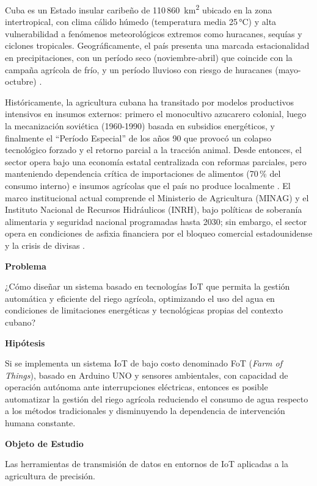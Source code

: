 Cuba es un Estado insular caribeño de 110\,860~km\textsuperscript{2} ubicado en la zona intertropical, con clima cálido húmedo (temperatura media 25\,°C) y alta vulnerabilidad a fenómenos meteorológicos extremos como huracanes, sequías y ciclones tropicales. Geográficamente, el país presenta una marcada estacionalidad en precipitaciones, con un período seco (noviembre-abril) que coincide con la campaña agrícola de frío, y un período lluvioso con riesgo de huracanes (mayo-octubre) \citep{onei2024}.

Históricamente, la agricultura cubana ha transitado por modelos productivos intensivos en insumos externos: primero el monocultivo azucarero colonial, luego la mecanización soviética (1960-1990) basada en subsidios energéticos, y finalmente el ``Período Especial'' de los años 90 que provocó un colapso tecnológico forzado y el retorno parcial a la tracción animal. Desde entonces, el sector opera bajo una economía estatal centralizada con reformas parciales, pero manteniendo dependencia crítica de importaciones de alimentos (70\,\% del consumo interno) e insumos agrícolas que el país no produce localmente \citep{rosset2020}. El marco institucional actual comprende el Ministerio de Agricultura (MINAG) y el Instituto Nacional de Recursos Hidráulicos (INRH), bajo políticas de soberanía alimentaria y seguridad nacional programadas hasta 2030; sin embargo, el sector opera en condiciones de asfixia financiera por el bloqueo comercial estadounidense y la crisis de divisas \citep{alnap2024, leyssan2022}.

\bigskip
\noindent\textbf{Problema}

\noindent ¿Cómo diseñar un sistema basado en tecnologías IoT que permita la gestión automática y eficiente del riego agrícola, optimizando el uso del agua en condiciones de limitaciones energéticas y tecnológicas propias del contexto cubano?

\bigskip
\noindent\textbf{Hipótesis}

\noindent Si se implementa un sistema IoT de bajo costo denominado FoT (\textit{Farm of Things}), basado en Arduino UNO y sensores ambientales, con capacidad de operación autónoma ante interrupciones eléctricas, entonces es posible automatizar la gestión del riego agrícola reduciendo el consumo de agua respecto a los métodos tradicionales y disminuyendo la dependencia de intervención humana constante.

\bigskip
\noindent\textbf{Objeto de Estudio}

\noindent Las herramientas de transmisión de datos en entornos de IoT aplicadas a la agricultura de precisión.

